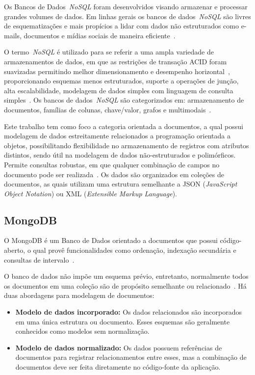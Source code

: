 \documentclass{svproc}
\begin{document}
Os Bancos de Dados~\emph{NoSQL} foram desenvolvidos visando armazenar e processar grandes volumes de dados. 
Em linhas gerais os bancos de dados~\emph{NoSQL} são livres de esquematizações e mais propícios a lidar com dados não estruturados como e-mails, documentos e mídias sociais de maneira eficiente~\cite{mohamed:2014,ramesh:2016}.

O termo~\emph{NoSQL} é utilizado para se referir a uma ampla variedade de armazenamentos de dados, em que as restrições de transação ACID foram suavizadas permitindo melhor dimensionamento e desempenho horizontal~\cite{rafique:2018}, proporcionando esquemas menos estruturados, suporte a operações de junção, alta escalabilidade, modelagem de dados simples com linguagem de consulta simples~\cite{ramesh:2016}. 
Os bancos de dados~\emph{NoSQL} são categorizados em: armazenamento de documentos, famílias de colunas, chave/valor, grafos e multimodais~\cite{aparicio:2016}.

Este trabalho tem como foco a categoria orientada a documentos, a qual possui modelagem de dados estreitamente relacionados a programação orientada a objetos, possibilitando flexibilidade no armazenamento de registros com atributos distintos, sendo útil na modelagem de dados não-estruturados e polimórficos. Permite consultas robustas, em que qualquer combinação de campos no documento pode ser realizada~\cite{patil:2017}. Os dados são organizados em coleções de documentos, as quais utilizam uma estrutura semelhante a JSON (\emph{JavaScript Object Notation}) ou XML (\emph{Extensible Markup Language}).

\subsection{MongoDB}

O MongoDB é um Banco de Dados orientado a documentos que possui código-aberto, o qual provê funcionalidades como ordenação, indexação secundária e consultas de intervalo~\cite{membrey2011definitive}.
 
O banco de dados não impõe um esquema prévio, entretanto, normalmente todos os documentos em uma coleção são de propósito semelhante ou relacionado~\cite{kanade2014study,lutu2015big}. Há duas abordagens para modelagem de documentos:

\begin{itemize}
\item \textbf{Modelo de dados incorporado:} Os dados relacionados são incorporados em uma única estrutura ou documento. Esses esquemas são geralmente conhecidos como modelos sem normalização. %
\item \textbf{Modelo de dados normalizado:} Os dados possuem referências de documentos para registrar relacionamentos entre esses, mas a combinação de documentos deve ser feita diretamente no código-fonte da aplicação. %
\end{itemize}
\end{document}
